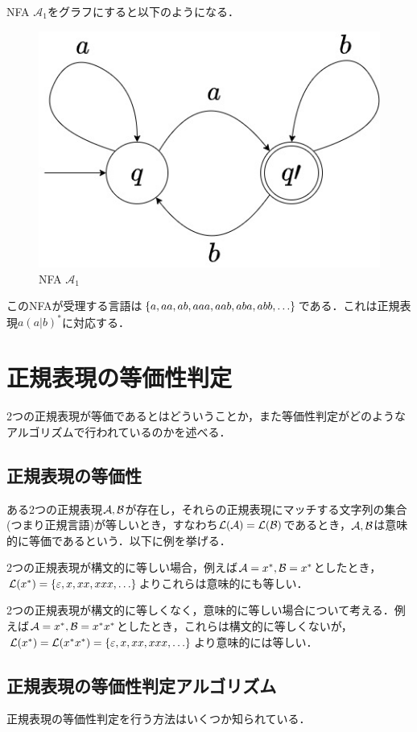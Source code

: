 \documentclass[a4paper, 12pt, dvipdfmx, uplatex]{jsreport}
\begin{document}
NFA $\mathcal{A}_1$をグラフにすると以下のようになる．
\begin{figure}[H] %
  \centering
  \includegraphics[width=0.5\linewidth]{../figures/nfa.jpg}
  \caption{NFA $\mathcal{A}_1$\label{nfa_example}}
\end{figure}

このNFAが受理する言語は$\qty{a,aa,ab,aaa,aab,aba,abb,\ldots}$である．これは正規表現$a(a|b)^*$に対応する．


\section{正規表現の等価性判定}
2つの正規表現が等価であるとはどういうことか，また等価性判定がどのようなアルゴリズムで行われているのかを述べる．

\subsection{正規表現の等価性}
ある2つの正規表現$\mathcal{A},\mathcal{B}$が存在し，それらの正規表現にマッチする文字列の集合(つまり正規言語)が等しいとき，すなわち$\mathcal{L(A)}=\mathcal{L(B)}$であるとき，$\mathcal{A},\mathcal{B}$は意味的に等価であるという．以下に例を挙げる．

2つの正規表現が構文的に等しい場合，例えば$\mathcal{A}=x^*,\mathcal{B}=x^*$としたとき，$\mathcal{L}(x^*)=\qty{\varepsilon,x,xx,xxx,\ldots}$よりこれらは意味的にも等しい．

2つの正規表現が構文的に等しくなく，意味的に等しい場合について考える．例えば$\mathcal{A}=x^*,\mathcal{B}=x^*x^*$としたとき，これらは構文的に等しくないが，$\mathcal{L}(x^*)=\mathcal{L}(x^*x^*)=\qty{\varepsilon,x,xx,xxx,\ldots}$より意味的には等しい．

\subsection{正規表現の等価性判定アルゴリズム}\label{eq_check}
正規表現の等価性判定を行う方法はいくつか知られている．
\end{document}
